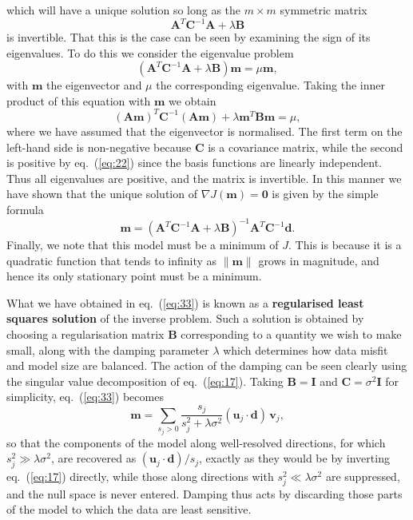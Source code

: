 which will have a unique solution so long as the $m\times m$ symmetric matrix
\begin{equation}
    \mathbf{A}^{T}\mathbf{C}^{-1}\mathbf{A} + \lambda \mathbf{B}
    \label{eq:30}
\end{equation}
is invertible. That this is the case can be seen by examining the sign of its eigenvalues. To do this we consider the eigenvalue problem
\begin{equation}
    (\mathbf{A}^{T}\mathbf{C}^{-1}\mathbf{A} + \lambda \mathbf{B})\mathbf{m} = \mu \mathbf{m},
    \label{eq:31}
\end{equation}
with $\mathbf{m}$ the eigenvector and $\mu$ the corresponding eigenvalue. Taking the inner product of this equation with $\mathbf{m}$ we obtain
\begin{equation}
    (\mathbf{A}\mathbf{m})^{T}\mathbf{C}^{-1}(\mathbf{A}\mathbf{m}) + \lambda \mathbf{m}^{T}\mathbf{B}\mathbf{m} = \mu,
    \label{eq:32}
\end{equation}
where we have assumed that the eigenvector is normalised. The first term on the left-hand side is non-negative because $\mathbf{C}$ is a covariance matrix, 
while the second is positive by eq.~(\ref{eq:22}) since the basis functions are linearly independent. Thus all eigenvalues are positive, and the matrix is invertible. In this 
manner we have shown that the unique solution of $\nabla J(\mathbf{m})=\mathbf{0}$ is given by the simple formula
\begin{equation}
    \mathbf{m} = (\mathbf{A}^{T}\mathbf{C}^{-1}\mathbf{A} + \lambda \mathbf{B})^{-1} \mathbf{A}^{T}\mathbf{C}^{-1}\mathbf{d}.
    \label{eq:33}
\end{equation}
Finally, we note that this model must be a minimum of $J$. This is because it is a quadratic function that tends to 
infinity as $\|\mathbf{m}\|$ grows in magnitude, and hence its only stationary point must be a minimum.

What we have obtained in eq.~(\ref{eq:33}) is known as a \textbf{regularised least squares solution} of the inverse problem. Such a 
solution is obtained by choosing a regularisation matrix $\mathbf{B}$ corresponding to a quantity we wish to make 
small, along with the damping parameter $\lambda$ which determines how data misfit and model size are balanced. 
The action of the damping can be seen clearly using the singular value decomposition of eq.~(\ref{eq:17}). Taking 
$\mathbf{B}=\mathbf{I}$ and $\mathbf{C}=\sigma^{2}\mathbf{I}$ for simplicity, eq.~(\ref{eq:33}) becomes
\begin{equation}
    \mathbf{m}=\sum_{s_{j}>0}\frac{s_{j}}{s_{j}^{2}+\lambda\sigma^{2}}(\mathbf{u}_{j}\cdot\mathbf{d})\,\mathbf{v}_{j},
    \label{eq:34}
\end{equation}
so that the components of the model along well-resolved directions, for which $s_{j}^{2}\gg\lambda\sigma^{2}$, are 
recovered as $(\mathbf{u}_{j}\cdot\mathbf{d})/s_{j}$, exactly as they would be by inverting eq.~(\ref{eq:17}) directly, 
while those along directions with $s_{j}^{2}\ll\lambda\sigma^{2}$ are suppressed, and the null space is never entered. 
Damping thus acts by discarding those parts of the model to which the data are least sensitive.

